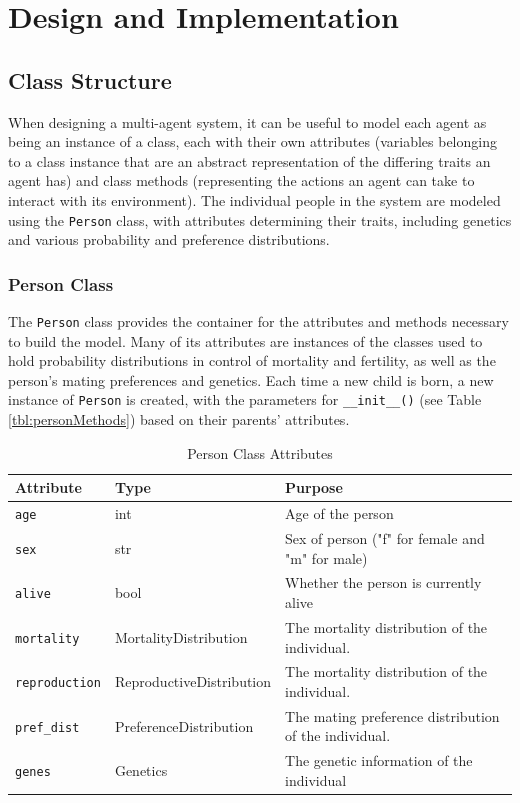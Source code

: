 \documentclass[authoryearcitations]{UoYCSproject}
\begin{document}
\chapter{Design and Implementation}
\label{cha:Design and Implementation}

\section{Class Structure}
When designing a multi-agent system, it can be useful to model each agent as being an instance of a class, each with their own attributes (variables belonging to a class instance that are an abstract representation of the differing traits an agent has) and class methods (representing the actions an agent can take to interact with its environment). The individual people in the system are modeled using the \texttt{Person} class, with attributes determining their traits, including genetics and various probability and preference distributions. 

\newpage
\subsection{Person Class}
The \texttt{Person} class provides the container for the attributes and methods necessary to build the model. Many of its attributes are instances of the classes used to hold probability distributions in control of mortality and fertility, as well as the person's mating preferences and genetics. Each time a new child is born, a new instance of \texttt{Person} is created, with the parameters for \texttt{\_\_init\_\_()} (see Table \ref{tbl:personMethods}) based on their parents' attributes.

\begin{table}[h]
\caption{Person Class Attributes}
\label{tbl:personAttributes}
\begin{tabular}{l l m{5cm}}
\textbf{Attribute} & \textbf{Type} & \textbf{Purpose} \\\hline
\texttt{age} & int & Age of the person \\\hline
\texttt{sex} & str & Sex of person ("f" for female and "m" for male) \\\hline
\texttt{alive} & bool & Whether the person is currently alive \\\hline
\texttt{mortality} & MortalityDistribution & The mortality distribution of the individual. \\\hline
\texttt{reproduction} & ReproductiveDistribution & The mortality distribution of the individual. \\\hline
\texttt{pref\_dist} & PreferenceDistribution & The mating preference distribution of the individual. \\\hline 
\texttt{genes} & Genetics & The genetic information of the individual
\end{tabular}
\end{table}
\end{document}
